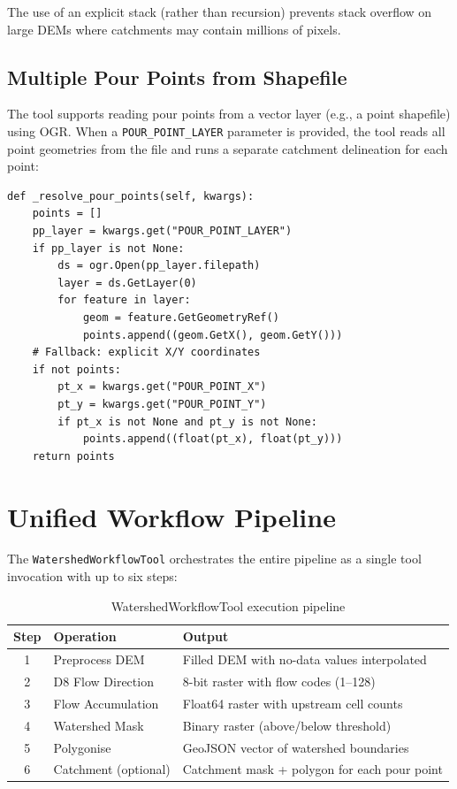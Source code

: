 The use of an explicit stack (rather than recursion) prevents stack overflow on
large DEMs where catchments may contain millions of pixels.

\subsection{Multiple Pour Points from Shapefile}

The tool supports reading pour points from a vector layer (e.g., a point
shapefile) using OGR.  When a \texttt{POUR\_POINT\_LAYER} parameter is provided,
the tool reads all point geometries from the file and runs a separate catchment
delineation for each point:

\begin{lstlisting}
def _resolve_pour_points(self, kwargs):
    points = []
    pp_layer = kwargs.get("POUR_POINT_LAYER")
    if pp_layer is not None:
        ds = ogr.Open(pp_layer.filepath)
        layer = ds.GetLayer(0)
        for feature in layer:
            geom = feature.GetGeometryRef()
            points.append((geom.GetX(), geom.GetY()))
    # Fallback: explicit X/Y coordinates
    if not points:
        pt_x = kwargs.get("POUR_POINT_X")
        pt_y = kwargs.get("POUR_POINT_Y")
        if pt_x is not None and pt_y is not None:
            points.append((float(pt_x), float(pt_y)))
    return points
\end{lstlisting}

\section{Unified Workflow Pipeline}

The \texttt{WatershedWorkflowTool} orchestrates the entire pipeline as a single
tool invocation with up to six steps:

\begin{table}[ht]
\centering
\caption{WatershedWorkflowTool execution pipeline}
\begin{tabular}{clp{7cm}}
\toprule
\textbf{Step} & \textbf{Operation} & \textbf{Output} \\
\midrule
1 & Preprocess DEM        & Filled DEM with no-data values interpolated \\
2 & D8 Flow Direction     & 8-bit raster with flow codes (1--128) \\
3 & Flow Accumulation     & Float64 raster with upstream cell counts \\
4 & Watershed Mask        & Binary raster (above/below threshold) \\
5 & Polygonise            & GeoJSON vector of watershed boundaries \\
6 & Catchment (optional)  & Catchment mask + polygon for each pour point \\
\bottomrule
\end{tabular}
\end{table}


